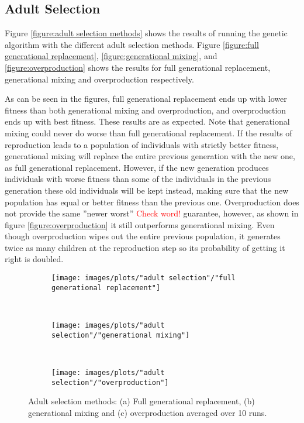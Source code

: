 \documentclass[12pt]{report}
\begin{document}
\subsection{Adult Selection}
Figure \ref{figure:adult selection methods} shows the results of running the genetic algorithm with the different adult selection methods. Figure \ref{figure:full generational replacement}, \ref{figure:generational mixing}, and \ref{figure:overproduction} shows the results for full generational replacement, generational mixing and overproduction respectively. 

As can be seen in the figures, full generational replacement ends up with lower fitness than both generational mixing and overproduction, and overproduction ends up with best fitness. These results are as expected. Note that generational mixing could never do worse than full generational replacement. If the results of reproduction leads to a population of individuals with strictly better fitness, generational mixing will replace the entire previous generation with the new one, as full generational replacement. However, if the new generation produces individuals with worse fitness than some of the individuals in the previous generation these old individuals will be kept instead, making sure that the new population has equal or better fitness than the previous one. Overproduction does not provide the same ''newer worst'' \textcolor{red}{Check word!} guarantee, however, as shown in figure \ref{figure:overproduction} it still outperforms generational mixing. Even though overproduction wipes out the entire previous population, it generates twice as many children at the reproduction step so its probability of getting it right is doubled. 


\begin{figure}[h!]
    \centering
    \begin{subfigure}[b]{0.31\textwidth}
        \texttt{[image: images/plots/"adult selection"/"full generational replacement"]}
        \caption{}
        \hfill
        \label{plot:full generational replacement}
    \end{subfigure}
    ~
    \begin{subfigure}[b]{0.31\textwidth}
        \texttt{[image: images/plots/"adult selection"/"generational mixing"]}
        \caption{}
        \hfill
        \label{plot:generational mixing}
    \end{subfigure}
    ~
    \begin{subfigure}[b]{0.31\textwidth}
        \texttt{[image: images/plots/"adult selection"/"overproduction"]}
        \caption{}
        \hfill
        \label{plot:overproduction}
    \end{subfigure}
    \caption{Adult selection methods: (a) Full generational replacement, (b) generational mixing and (c) overproduction averaged over 10 runs.}
    \label{plot:adult selection methods}
\end{figure}
\end{document}
